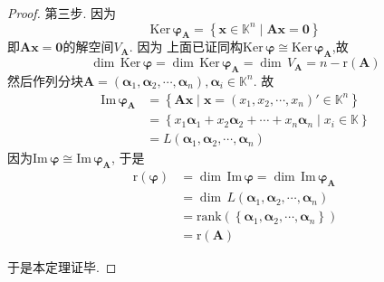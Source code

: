 {\begin{proof}
        第三步. 因为
        \[
            \mathrm{Ker}\,\bm{\varphi}_{\bm{A}}
            =\left\{\bm{x}\in \mathbb{K}^n\mid\bm{Ax}=\bm{0}
            \right\}
        \]
        即$\bm{Ax}=\bm{0}$的解空间$V_{\bm{A}}$. 因为
        上面已证同构$\mathrm{Ker}\,\bm{\varphi}\cong \mathrm{Ker}\,\bm{\varphi}_{\bm{A}}$,故
        \[
            \dim\,\mathrm{Ker}\,\bm{\varphi}=\dim\,\mathrm{Ker}\,\bm{\varphi}_{\bm{A}}=\dim\,V_{\bm{A}}=n-\mathrm{r}\left(\bm{A}
            \right)
        \]
        然后作列分块$\bm{A}=\left(\bm{\alpha}_1,\bm{\alpha}_2,\cdots,\bm{\alpha}_n\right),\bm{\alpha}_i\in \mathbb{K}^n$.
        故
        \begin{align*}
            \mathrm{Im}\,\bm{\varphi}_{\bm{A}} & =\left\{
            \bm{Ax}\mid\bm{x}=\left(x_1,x_2,\cdots,x_n\right)'\in \mathbb{K}^n
            \right\}                                                                                             \\
                                               & =\left\{x_1\bm{\alpha}_1+x_2\bm{\alpha}_2+\cdots+
            x_n\bm{\alpha}_n\mid x_i\in \mathbb{K}\right\}                                                       \\
                                               & =L\left(\bm{\alpha}_1,\bm{\alpha}_2,\cdots,\bm{\alpha}_n\right)
        \end{align*}
        因为$\mathrm{Im}\,\bm{\varphi}\cong \mathrm{Im}\,\bm{\varphi}_{\bm{A}}$,
        于是
        \begin{align*}
            \mathrm{r}\left(\bm{\varphi}\right) & =\dim\,\mathrm{Im}\,\bm{\varphi}=\dim\,\mathrm{Im}\,\bm{\varphi}_{\bm{A}}                  \\
                                                & =\dim\,L\left(\bm{\alpha}_1,\bm{\alpha}_2,\cdots,\bm{\alpha}_n\right)
            \\
                                                & =\mathrm{rank}\left(\left\{\bm{\alpha}_1,\bm{\alpha}_2,\cdots,\bm{\alpha}_n\right\}\right) \\
                                                & =\mathrm{r}\left(\bm{A}\right)
        \end{align*}

        于是本定理证毕.
    \end{proof}
}
